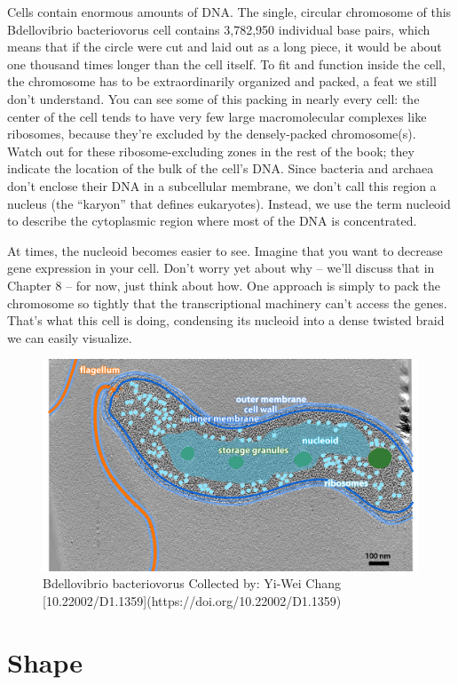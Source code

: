 \documentclass[]{tufte-book}
\begin{document}
Cells contain enormous amounts of DNA. The single, circular chromosome
of this Bdellovibrio bacteriovorus cell contains 3,782,950 individual
base pairs, which means that if the circle were cut and laid out as a
long piece, it would be about one thousand times longer than the cell
itself. To fit and function inside the cell, the chromosome has to be
extraordinarily organized and packed, a feat we still don't understand.
You can see some of this packing in nearly every cell: the center of the
cell tends to have very few large macromolecular complexes like
ribosomes, because they're excluded by the densely-packed chromosome(s).
Watch out for these ribosome-excluding zones in the rest of the book;
they indicate the location of the bulk of the cell's DNA. Since bacteria
and archaea don't enclose their DNA in a subcellular membrane, we don't
call this region a nucleus (the ``karyon'' that defines eukaryotes).
Instead, we use the term nucleoid to describe the cytoplasmic region
where most of the DNA is concentrated.

At times, the nucleoid becomes easier to see. Imagine that you want to
decrease gene expression in your cell. Don't worry yet about why --
we'll discuss that in Chapter 8 -- for now, just think about how. One
approach is simply to pack the chromosome so tightly that the
transcriptional machinery can't access the genes. That's what this cell
is doing, condensing its nucleoid into a dense twisted braid we can
easily visualize.

\begin{figure}
\includegraphics{img/2_10_Bbacteriovorus} \caption[Bdellovibrio bacteriovorus Collected by]{Bdellovibrio bacteriovorus Collected by: Yi-Wei Chang [10.22002/D1.1359](https://doi.org/10.22002/D1.1359)}\label{fig:unnamed-chunk-26}
\end{figure}

\chapter{Shape}\label{shape}


\end{document}
